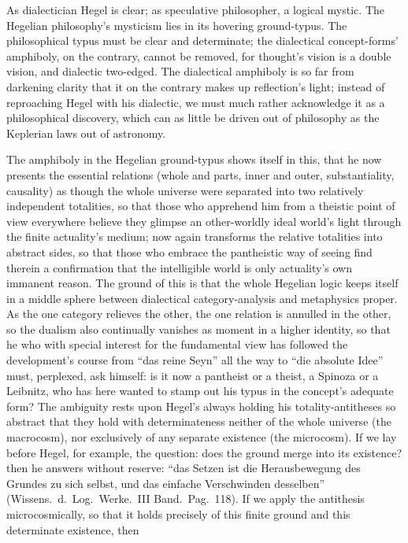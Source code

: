 \documentclass[12pt]{book}
\begin{document}
As dialectician Hegel is clear; as speculative philosopher, a logical
mystic. The Hegelian philosophy's mysticism lies in its hovering
ground-typus. The philosophical typus must be clear and determinate; the
dialectical concept-forms' amphiboly, on the contrary, cannot be removed,
for thought's vision is a double vision, and dialectic two-edged. The
dialectical amphiboly is so far from darkening clarity that it on the
contrary makes up reflection's light; instead of reproaching Hegel with his
dialectic, we must much rather acknowledge it as a philosophical discovery,
which can as little be driven out of philosophy as the Keplerian laws out of
astronomy.

The amphiboly in the Hegelian ground-typus shows itself in this, that he now
presents the essential relations (whole and parts, inner and outer,
substantiality, causality) as though the whole universe were separated into
two relatively independent totalities, so that those who apprehend him from
a theistic point of view everywhere believe they glimpse an other-worldly
ideal world's light through the finite actuality's medium; now again
transforms the relative totalities into abstract sides, so that those who
embrace the pantheistic way of seeing find therein a confirmation that the
intelligible world is only actuality's own immanent reason. The ground of
this is that the whole Hegelian logic keeps itself in a middle sphere
between dialectical category-analysis and metaphysics proper. As the one
category relieves the other, the one relation is annulled in the other, so
the dualism also continually vanishes as moment in a higher identity, so
that he who with special interest for the fundamental view has followed the
development's course from ``das reine Seyn'' all the way to ``die absolute
Idee'' must, perplexed, ask himself: is it now a pantheist or a theist, a
Spinoza or a Leibnitz, who has here wanted to stamp out his typus in the
concept's adequate form? The ambiguity rests upon Hegel's always holding his
totality-antitheses so abstract that they hold with determinateness neither
of the whole universe (the macrocosm), nor exclusively of any separate
existence (the microcosm). If we lay before Hegel, for example, the
question: does the ground merge into its existence? then he answers without
reserve: ``das Setzen ist die Herausbewegung des Grundes zu sich selbst, und
das einfache Verschwinden desselben'' (Wissens.\ d.\ Log.\ Werke.\ III
Band.\ Pag.\ 118). If we apply the antithesis microcosmically, so that it
holds precisely of this finite ground and this determinate existence, then
\end{document}
